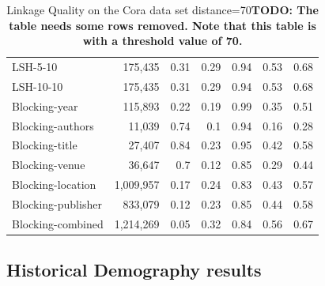 \documentclass{llncs}
\begin{document}
\begin{table}[ht]
\begin{tabular}{l|r|r|r|r|r|r}
LSH-5-10           &  175,435                     & 0.31                  & 0.29                       & 0.94      & 0.53   & 0.68       \\
LSH-10-10          &  175,435                     & 0.31                  & 0.29                       & 0.94      & 0.53   & 0.68       \\  \hline
Blocking-year      &  115,893                     & 0.22                  & 0.19                       & 0.99      & 0.35   & 0.51       \\
Blocking-authors   &   11,039                      & 0.74                  & 0.1                        & 0.94      & 0.16   & 0.28       \\
Blocking-title     &   27,407                      & 0.84                  & 0.23                       & 0.95      & 0.42   & 0.58       \\
Blocking-venue     &   36,647                      & 0.7                   & 0.12                       & 0.85      & 0.29   & 0.44       \\
Blocking-location  & 1,009,957                    & 0.17                  & 0.24                       & 0.83      & 0.43   & 0.57       \\
Blocking-publisher &  833,079                     & 0.12                  & 0.23                       & 0.85      & 0.44   & 0.58       \\
Blocking-combined  & 1,214,269                    & 0.05                  & 0.32                       & 0.84      & 0.56   & 0.67       \\ \hline
\end{tabular}
\caption{Linkage Quality on the Cora data set distance=70\label{comparison-of-results-cora}
\textbf{TODO: The table needs some rows removed. Note that this table is with a threshold value of 70.}
}
\end{table}



\subsection{Historical Demography results}
\end{document}
